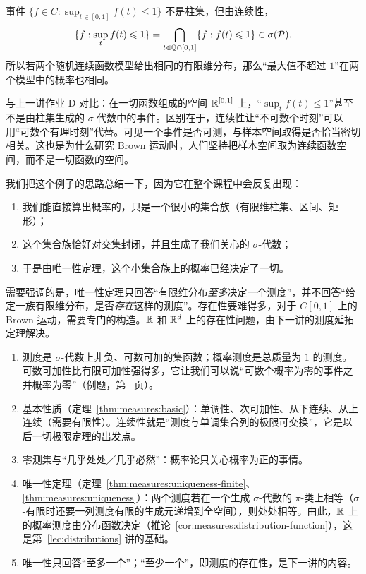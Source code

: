 \begin{example}
事件 $\{f\in C:\sup_{t\in[0,1]}f(t)\leqslant1\}$ 不是柱集，但由连续性，
\[
\{f:\sup_tf(t)\leqslant1\}=\bigcap_{t\in\mathbb{Q}\cap[0,1]}\{f:f(t)\leqslant1\}\in\sigma(\mathcal{P}).
\]
所以若两个随机连续函数模型给出相同的有限维分布，那么“最大值不超过 $1$”在两个模型中的概率也相同。

与上一讲作业 D 对比：在一切函数组成的空间 $\mathbb{R}^{[0,1]}$ 上，“$\sup_tf(t)\leqslant1$”甚至不是由柱集生成的 $\sigma$-代数中的事件。区别在于，连续性让“不可数个时刻”可以用“可数个有理时刻”代替。可见一个事件是否可测，与样本空间取得是否恰当密切相关。这也是为什么研究 Brown 运动时，人们坚持把样本空间取为连续函数空间，而不是一切函数的空间。
\end{example}

\begin{remark}
我们把这个例子的思路总结一下，因为它在整个课程中会反复出现：
\begin{enumerate}
\item 我们能直接算出概率的，只是一个很小的集合族（有限维柱集、区间、矩形）；
\item 这个集合族恰好对交集封闭，并且生成了我们关心的 $\sigma$-代数；
\item 于是由唯一性定理，这个小集合族上的概率已经决定了一切。
\end{enumerate}
需要强调的是，唯一性定理只回答“有限维分布\emph{至多}决定一个测度”，并不回答“给定一族有限维分布，是否\emph{存在}这样的测度”。存在性要难得多，对于 $C[0,1]$ 上的 Brown 运动，需要专门的构造。$\mathbb{R}$ 和 $\mathbb{R}^d$ 上的存在性问题，由下一讲的测度延拓定理解决。
\end{remark}


\begin{enumerate}
\item 测度是 $\sigma$-代数上非负、可数可加的集函数；概率测度是总质量为 $1$ 的测度。可数可加性比有限可加性强得多，它让我们可以说“可数个概率为零的事件之并概率为零”（例题，第~\pageref{we:measures:rationals} 页）。
\item 基本性质（定理~\ref{thm:measures:basic}）：单调性、次可加性、从下连续、从上连续（需要有限性）。连续性就是“测度与单调集合列的极限可交换”，它是以后一切极限定理的出发点。
\item 零测集与“几乎处处／几乎必然”：概率论只关心概率为正的事情。
\item 唯一性定理（定理~\ref{thm:measures:uniqueness-finite}、\ref{thm:measures:uniqueness}）：两个测度若在一个生成 $\sigma$-代数的 $\pi$-类上相等（$\sigma$-有限时还要一列测度有限的生成元递增到全空间），则处处相等。由此，$\mathbb{R}$ 上的概率测度由分布函数决定（推论~\ref{cor:measures:distribution-function}），这是第~\ref{lec:distributions} 讲的基础。
\item 唯一性只回答“至多一个”；“至少一个”，即测度的存在性，是下一讲的内容。
\end{enumerate}

